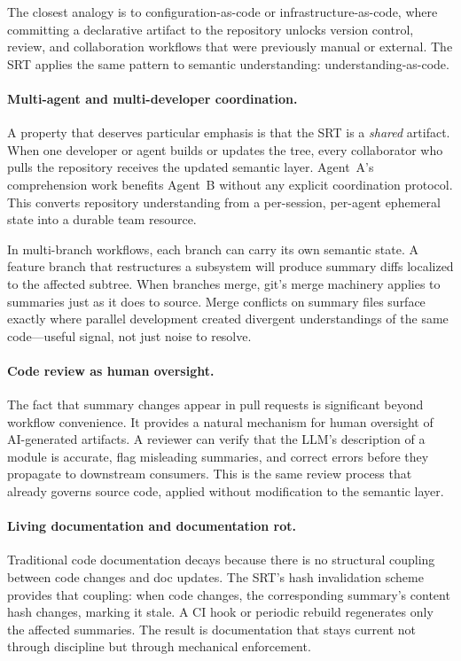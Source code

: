 \documentclass[11pt,a4paper]{article}
\newcommand{\srt}{\textsc{SRT}}
\begin{document}
The closest analogy is to configuration-as-code or infrastructure-as-code, where committing a declarative artifact to the repository unlocks version control, review, and collaboration workflows that were previously manual or external.
The \srt{} applies the same pattern to semantic understanding: understanding-as-code.

\paragraph{Multi-agent and multi-developer coordination.}
A property that deserves particular emphasis is that the \srt{} is a \emph{shared} artifact.
When one developer or agent builds or updates the tree, every collaborator who pulls the repository receives the updated semantic layer.
Agent~A's comprehension work benefits Agent~B without any explicit coordination protocol.
This converts repository understanding from a per-session, per-agent ephemeral state into a durable team resource.

In multi-branch workflows, each branch can carry its own semantic state.
A feature branch that restructures a subsystem will produce summary diffs localized to the affected subtree.
When branches merge, git's merge machinery applies to summaries just as it does to source.
Merge conflicts on summary files surface exactly where parallel development created divergent understandings of the same code---useful signal, not just noise to resolve.

\paragraph{Code review as human oversight.}
The fact that summary changes appear in pull requests is significant beyond workflow convenience.
It provides a natural mechanism for human oversight of AI-generated artifacts.
A reviewer can verify that the LLM's description of a module is accurate, flag misleading summaries, and correct errors before they propagate to downstream consumers.
This is the same review process that already governs source code, applied without modification to the semantic layer.

\paragraph{Living documentation and documentation rot.}
Traditional code documentation decays because there is no structural coupling between code changes and doc updates.
The \srt{}'s hash invalidation scheme provides that coupling: when code changes, the corresponding summary's content hash changes, marking it stale.
A CI hook or periodic rebuild regenerates only the affected summaries.
The result is documentation that stays current not through discipline but through mechanical enforcement.
\end{document}
